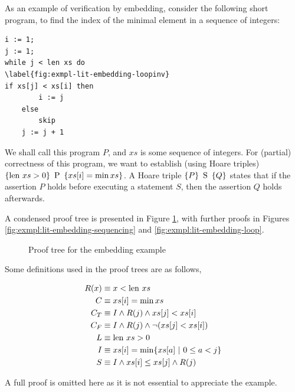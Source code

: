 \begin{example}
  \label{exmpl:lit-embedding}
  As an example of verification by embedding, consider the following
  short program, to find the index of the minimal element in a
  sequence of integers:

\begin{verbatim}
i := 1;
j := 1;
while j < len xs do
\label{fig:exmpl-lit-embedding-loopinv}
if xs[j] < xs[i] then
        i := j
    else
        skip
    j := j + 1
\end{verbatim}

  We shall call this program $P$, and $xs$ is some sequence of
  integers. For (partial) correctness of this program, we want to
  establish (using Hoare triples) $\htriple{\len xs > 0}{P}{xs[i] =
    \min xs}$. A Hoare triple $\htriple{P}{S}{Q}$ states that if the
  assertion $P$ holds before executing a statement $S$, then the
  assertion $Q$ holds afterwards.

  A condensed proof tree is presented in Figure
  \ref{fig:exmpl:lit-embedding-tree}, with further proofs in Figures
  \ref{fig:exmpl:lit-embedding-sequencing} and
  \ref{fig:exmpl:lit-embedding-loop}.

  \begin{figure}[t]
    \centering
    \begin{prooftree}


    \end{prooftree}
    \caption{Proof tree for the embedding example}
    \label{fig:exmpl:lit-embedding-tree}
  \end{figure}

  Some definitions used in the proof trees are as follows,

  \begin{align*}
    R(x) &\equiv x < \len xs\\
    C    &\equiv xs[i] = \min xs\\
    C_{T} & \equiv I \land R(j) \land xs[j] < xs[i]\\
    C_{F} & \equiv I \land R(j) \land \lnot(xs[j] < xs[i])\\
    L    & \equiv \len xs > 0\\
    I    & \equiv xs[i] = \min \{xs[a]~|~0 \leq a < j\}\\
    S    & \equiv I \land xs[i] \leq xs[j] \land R(j)
  \end{align*}

  A full proof is omitted here as it is not essential to appreciate
  the example.
\end{example}

